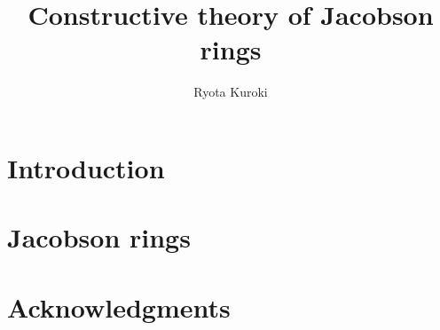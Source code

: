 \documentclass{article}
\title{Constructive theory of Jacobson rings}
\author{Ryota Kuroki}
\affil{Graduate School of Mathematical Sciences, The University of Tokyo}
\date{}
\begin{document}
\maketitle
\section{Introduction}
\section{Jacobson rings}
\section*{Acknowledgments}
\end{document}
